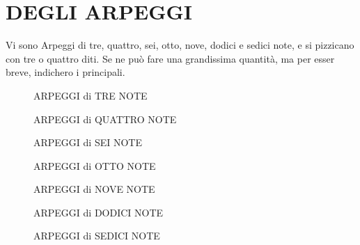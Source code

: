 \documentclass[a4paper]{book}
\begin{document}
\chapter[Gli arpeggi ed un esercizio]{DEGLI ARPEGGI}

Vi sono Arpeggi di tre, quattro, sei, otto, nove, dodici e sedici note, e si pizzicano con tre o quattro diti.  Se ne può fare una grandissima quantità, ma per esser breve, indichero i principali.

\begin{figure}[H]
  \centering
  \hspace*{15pt}
  \begin{minipage}{2.4in}
    \caption{ARPEGGI di TRE NOTE}
  \end{minipage}
  \hfill
  \begin{minipage}{3in}
    \caption{ARPEGGI di QUATTRO NOTE}
  \end{minipage}
  \hspace*{10pt}
\end{figure}

\begin{figure}[H]
  \centering
  \begin{minipage}{4.5in}
    \caption{ARPEGGI di SEI NOTE}
  \end{minipage}
\end{figure}

\begin{figure}[H]
  \centering
  \begin{minipage}{3.2in}
    \caption{ARPEGGI di OTTO NOTE}
  \end{minipage}
  \hfill
  \begin{minipage}{2.7in}
    \caption{ARPEGGI di NOVE NOTE}
  \end{minipage}
\end{figure}

\begin{figure}[H]
  \centering
  \begin{minipage}{4.4in}
    \caption{ARPEGGI di DODICI NOTE}
  \end{minipage}
\end{figure}

\begin{figure}[H]
  \centering
  \begin{minipage}{5.6in}
    \caption{ARPEGGI di SEDICI NOTE}
  \end{minipage}
\end{figure}
\end{document}
